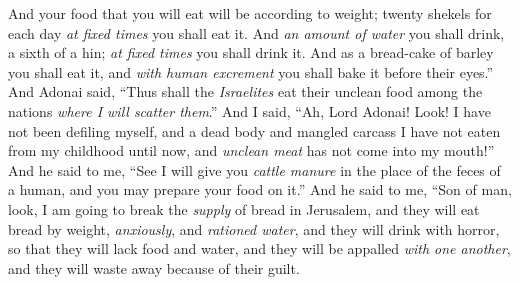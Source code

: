 \begin{biblechapter}
\verse And your food that you will eat will be according to weight; twenty shekels for each day \textit{at fixed times} you shall eat it.
\verse And \textit{an amount of water} you shall drink, a sixth of a hin; \textit{at fixed times} you shall drink it.
\verse And as a bread-cake of barley you shall eat it, and \textit{with human excrement} you shall bake it before their eyes.”
\verse And Adonai said, “Thus shall the \textit{Israelites} eat their unclean food among the nations \textit{where I will scatter them}.”
\verse And I said, “Ah, Lord Adonai! Look! I have not been defiling myself, and a dead body and mangled carcass I have not eaten from my childhood until now, and \textit{unclean meat} has not come into my mouth!”
\verse And he said to me, “See I will give you \textit{cattle manure} in the place of the feces of a human, and you may prepare your food on it.”
\verse And he said to me, “Son of man, look, I am going to break the \textit{supply} of bread in Jerusalem, and they will eat bread by weight, \textit{anxiously}, and \textit{rationed water}, and they will drink with horror,
\verse so that they will lack food and water, and they will be appalled \textit{with one another}, and they will waste away because of their guilt.
\end{biblechapter}

